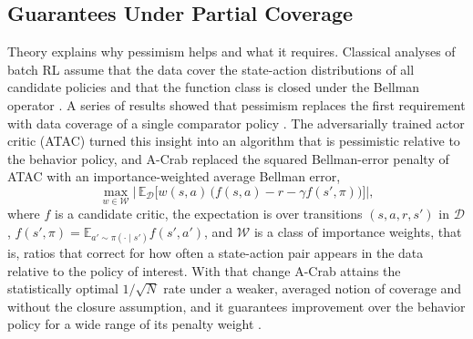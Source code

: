 \documentclass[journal]{IEEEtran}
\begin{document}
\subsection{Guarantees Under Partial Coverage}
Theory explains why pessimism helps and what it requires. Classical analyses of batch RL assume that the data cover the state-action distributions of all candidate policies and that the function class is closed under the Bellman operator \cite{chen2019information}. A series of results showed that pessimism replaces the first requirement with data coverage of a single comparator policy \cite{jin2021pessimism,rashidinejad2022bridging,xie2021bellman}. The adversarially trained actor critic (ATAC) \cite{cheng2022atac} turned this insight into an algorithm that is pessimistic relative to the behavior policy, and A-Crab \cite{zhu2023acrab} replaced the squared Bellman-error penalty of ATAC with an importance-weighted average Bellman error,
\begin{equation}
\max_{w \in \mathcal{W}} \Big|\, \mathbb{E}_{\mathcal{D}}\big[w(s,a)\,\big(f(s,a) - r - \gamma f(s',\pi)\big)\big] \Big|,
\label{eq:acrab}
\end{equation}
where $f$ is a candidate critic, the expectation is over transitions $(s,a,r,s')$ in $\mathcal{D}$, $f(s',\pi) = \mathbb{E}_{a' \sim \pi(\cdot \mid s')} f(s',a')$, and $\mathcal{W}$ is a class of importance weights, that is, ratios that correct for how often a state-action pair appears in the data relative to the policy of interest. With that change A-Crab attains the statistically optimal $1/\sqrt{N}$ rate under a weaker, averaged notion of coverage and without the closure assumption, and it guarantees improvement over the behavior policy for a wide range of its penalty weight \cite{zhu2023acrab}.
\end{document}
